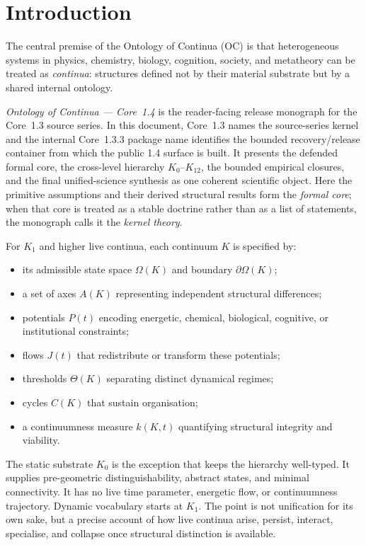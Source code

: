 
\section{Introduction}
\label{sec:intro}

The central premise of the Ontology of Continua (OC) is that heterogeneous
systems in physics, chemistry, biology, cognition, society, and metatheory can
be treated as \emph{continua}: structures defined
not by their material substrate but by a shared internal ontology.

\emph{Ontology of Continua --- Core~1.4} is the reader-facing release
monograph for the Core~1.3 source series. In this document, Core~1.3 names the
source-series kernel and the internal Core~1.3.3 package name identifies the
bounded recovery/release container from which the public 1.4 surface is built.
It presents the defended formal core, the cross-level hierarchy
\(K_0\)–\(K_{12}\), the bounded empirical closures, and the final
unified-science synthesis as one coherent scientific object.
Here the primitive assumptions and their derived structural results form the
\emph{formal core}; when that core is treated as a stable doctrine rather than
as a list of statements, the monograph calls it the \emph{kernel theory}.

For \(K_1\) and higher live continua, each continuum \(K\) is specified by:

\begin{itemize}
    \item its admissible state space \(\Omega(K)\) and boundary \(\partial\Omega(K)\);
    \item a set of axes \(A(K)\) representing independent structural differences;
    \item potentials \(P(t)\) encoding energetic, chemical, biological, cognitive, or institutional constraints;
    \item flows \(J(t)\) that redistribute or transform these potentials;
    \item thresholds \(\Theta(K)\) separating distinct dynamical regimes;
    \item cycles \(C(K)\) that sustain organisation;
    \item a continuumness measure \(k(K,t)\) quantifying structural integrity and viability.
\end{itemize}

The static substrate \(K_0\) is the exception that keeps the hierarchy
well-typed. It supplies pre-geometric distinguishability, abstract states, and
minimal connectivity. It has no live time parameter, energetic flow, or
continuumness trajectory. Dynamic vocabulary starts at \(K_1\). The point is not
unification for its own sake, but a precise account of how live continua arise,
persist, interact, specialise, and collapse once structural distinction is
available.

